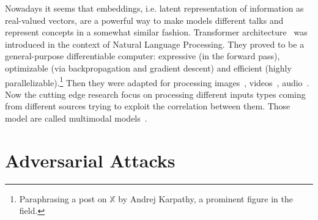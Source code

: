 Nowadays it seems that embeddings, i.e. latent representation of information as
real-valued vectors, are a powerful way to make models different talks and
represent concepts in a somewhat similar fashion. Transformer
architecture~\cite{AttentionIsAlVaswan2017} was introduced in the context of
Natural Language Processing. They proved to be a general-purpose differentiable
computer: expressive (in the forward pass), optimizable (via backpropagation
and gradient descent) and efficient (highly
parallelizable).\footnote{Paraphrasing a post on $\mathbb{X}$ by Andrej
Karpathy, a prominent figure in the field.} Then they were adapted for
processing images~\cite{ImageTransformParmar2018, EndToEndObjeCarion2020,
AnImageIsWorDosovi2020}, videos~\cite{VivitAVideoArnab2021,
TemporalContexShao2020}, audio~\cite{NeuralSpeechSLiNa2018,
SpeechTransforDong2018, ConformerConvGulati2020}. Now the cutting edge research
focus on processing different inputs types coming from different sources trying
to exploit the correlation between them. Those model are called multimodal
models~\cite{ASurveyOnMulYinS2023}.


\section{Adversarial Attacks}
\label{sec:adversarial-attacks}

